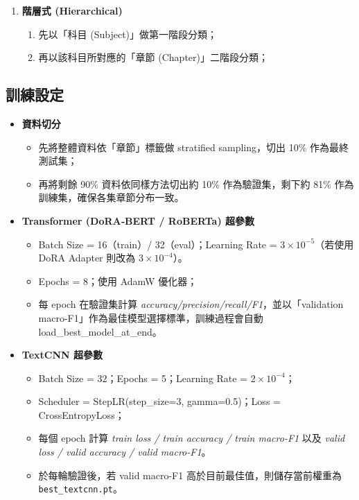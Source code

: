 \documentclass[10pt,conference]{IEEEtran}
\begin{document}
\begin{CJK}{UTF8}{bsmi}
\begin{enumerate}
  \item \textbf{階層式 (Hierarchical)}  
    \begin{enumerate}[label=(\alph*)]
      \item 先以「科目 (Subject)」做第一階段分類；  
      \item 再以該科目所對應的「章節 (Chapter)」二階段分類；  
    \end{enumerate}
\end{enumerate}

\subsection{訓練設定}
\begin{itemize}
  \item \textbf{資料切分}  
    \begin{itemize}
      \item 先將整體資料依「章節」標籤做 stratified sampling，切出 10\% 作為最終測試集；  
      \item 再將剩餘 90\% 資料依同樣方法切出約 10\% 作為驗證集，剩下約 81\% 作為訓練集，確保各集章節分布一致。  
    \end{itemize}

  \item \textbf{Transformer (DoRA‐BERT / RoBERTa) 超參數}  
    \begin{itemize}
      \item Batch Size = 16（train）/ 32（eval）；Learning Rate = $3\times10^{-5}$（若使用 DoRA Adapter 則改為 $3\times10^{-4}$）。  
      \item Epochs = 8；使用 AdamW 優化器；  
      \item 每 epoch 在驗證集計算 \textit{accuracy/precision/recall/F1}，並以「validation macro-F1」作為最佳模型選擇標準，訓練過程會自動 load\_best\_model\_at\_end。  
    \end{itemize}

  \item \textbf{TextCNN 超參數}  
    \begin{itemize}
      \item Batch Size = 32；Epochs = 5；Learning Rate = $2\times10^{-4}$；  
      \item Scheduler = StepLR(step\_size=3, gamma=0.5)；Loss = CrossEntropyLoss；  
      \item 每個 epoch 計算 \textit{train loss / train accuracy / train macro-F1} 以及 \textit{valid loss / valid accuracy / valid macro-F1}。  
      \item 於每輪驗證後，若 valid macro-F1 高於目前最佳值，則儲存當前權重為 \texttt{best\_textcnn.pt}。  
    \end{itemize}


\end{itemize}
\end{CJK}
\end{document}
